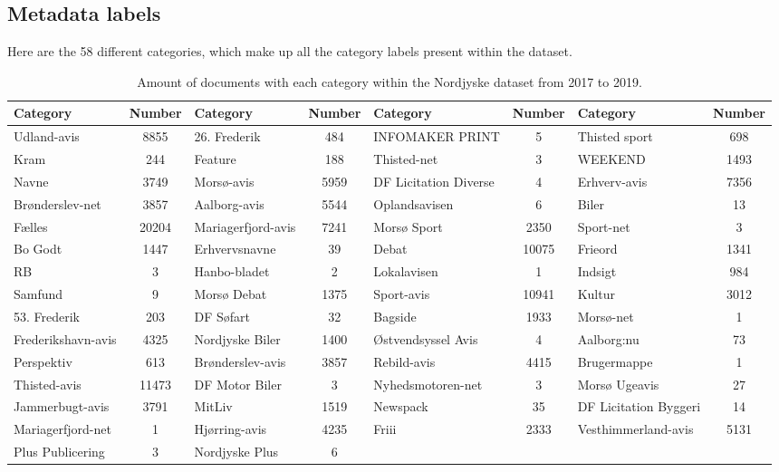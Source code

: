 \subsection{Metadata labels}\label{sec:appendix_meta_data}
Here are the 58 different categories, which make up all the category labels present within the dataset.

\begin{table*}[h]
	\centering
	\begin{tabular}{l|c|l|c|l|c|l|c}
		Category & Number & Category & Number & Category & Number & Category & Number \\
 		\toprule
		Udland-avis & 8855 & 26. Frederik & 484 & INFOMAKER PRINT & 5 & Thisted sport & 698\\
		Kram & 244 & Feature & 188 & Thisted-net & 3 & WEEKEND & 1493\\
		Navne & 3749 & Morsø-avis & 5959 & DF Licitation Diverse & 4 & Erhverv-avis & 7356\\
		Brønderslev-net & 3857 & Aalborg-avis & 5544 & Oplandsavisen & 6 & Biler & 13\\
		Fælles & 20204 & Mariagerfjord-avis & 7241 & Morsø Sport & 2350 & Sport-net & 3\\
		Bo Godt & 1447 & Erhvervsnavne & 39 & Debat & 10075 & Frieord & 1341\\
		RB & 3 & Hanbo-bladet & 2 & Lokalavisen & 1 & Indsigt & 984\\
		Samfund & 9 & Morsø Debat & 1375 & Sport-avis & 10941 & Kultur & 3012 \\
		53. Frederik & 203 & DF Søfart & 32 & Bagside & 1933 & Morsø-net & 1 \\
		Frederikshavn-avis & 4325 & Nordjyske Biler & 1400 & Østvendsyssel Avis & 4 & Aalborg:nu & 73\\
		Perspektiv & 613 & Brønderslev-avis & 3857 & Rebild-avis & 4415 & Brugermappe & 1\\
		Thisted-avis & 11473 & DF Motor Biler & 3 & Nyhedsmotoren-net & 3 & Morsø Ugeavis & 27\\
		Jammerbugt-avis & 3791 & MitLiv & 1519 & Newspack & 35 & DF Licitation Byggeri & 14\\
		Mariagerfjord-net & 1 & Hjørring-avis & 4235 & Friii & 2333 & Vesthimmerland-avis & 5131\\
		Plus Publicering & 3 & Nordjyske Plus & 6 & & & & \\
		\bottomrule
	\end{tabular}
	\caption{Amount of documents with each category within the Nordjyske dataset from 2017 to 2019.}
	\label{tab:category_table}
\end{table*}
